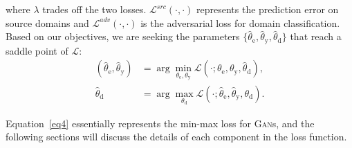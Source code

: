 \documentclass[sigconf]{acmart}
\theoremstyle{definition}
\begin{document}
where $\lambda$ trades off the two losses.  $\mathcal{L}^{src}(\cdot,\cdot)$ represents the prediction error on source domains and $\mathcal{L}^{adv}(\cdot,\cdot)$ is the adversarial loss for domain classification. Based on our objectives, we are seeking the parameters $\{\widehat{\theta}_\mathrm{e},\widehat{\theta}_\mathrm{y},\widehat{\theta}_\mathrm{d}\}$ that reach a saddle point of $\mathcal{L}$:\begin{equation}\label{eq4}
\begin{aligned}
\left(\widehat{\theta}_\mathrm{e}, \widehat{\theta}_\mathrm{y}\right)&=\arg \min _{\theta_\mathrm{e}, \theta_\mathrm{y}} \mathcal{L}\left(\cdot;\theta_\mathrm{e}, \theta_\mathrm{y}, \widehat{\theta}_\mathrm{d}\right),\\
\widehat{\theta}_\mathrm{d}&=\arg \max _{\theta_\mathrm{d}} \mathcal{L}\left(\cdot;\widehat{\theta}_\mathrm{e}, \widehat{\theta}_\mathrm{y}, \theta_\mathrm{d}\right).
\end{aligned}
\end{equation}

Equation~\ref{eq4} essentially represents the min-max loss for \textsc{Gan}s, and the following sections will discuss the details of each component in the loss function.
\end{document}
